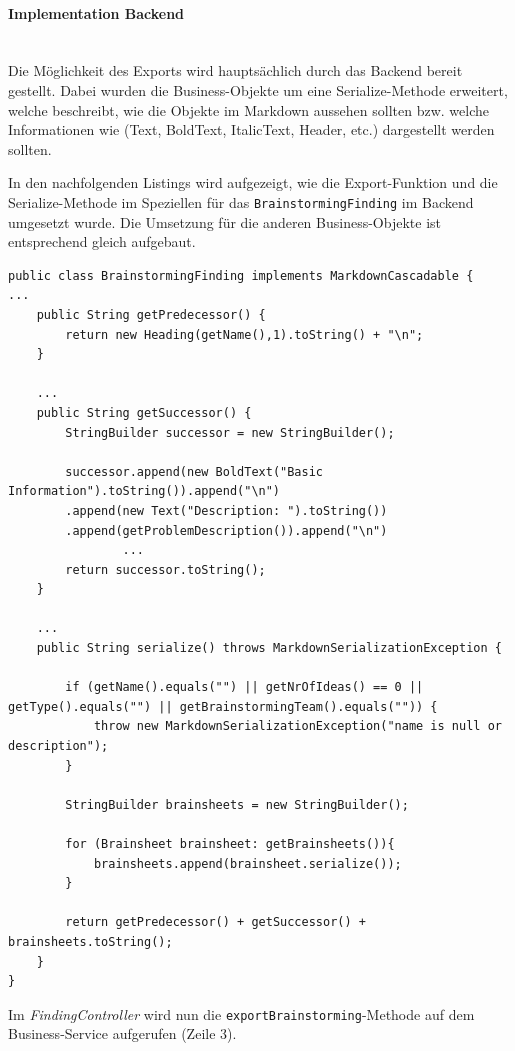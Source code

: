 \paragraph*{Implementation Backend}~\\
Die Möglichkeit des Exports wird hauptsächlich durch das Backend bereit gestellt. Dabei wurden die Business-Objekte um eine Serialize-Methode erweitert, welche beschreibt, wie die Objekte im Markdown aussehen sollten bzw. welche Informationen wie (Text, BoldText, ItalicText, Header, etc.) dargestellt werden sollten. 

In den nachfolgenden Listings wird aufgezeigt, wie die Export-Funktion und die Serialize-Methode im Speziellen für das \texttt{BrainstormingFinding} im Backend umgesetzt wurde. Die Umsetzung für die anderen Business-Objekte ist entsprechend gleich aufgebaut. 

\begin{lstlisting}[caption={Serialize-Methode von BrainstormingFinding}, label=markdownBrainstormingFinding]
public class BrainstormingFinding implements MarkdownCascadable {
...
	public String getPredecessor() {
	    return new Heading(getName(),1).toString() + "\n";
	}
	
	...
	public String getSuccessor() {
	    StringBuilder successor = new StringBuilder();
	
	    successor.append(new BoldText("Basic Information").toString()).append("\n")
	    .append(new Text("Description: ").toString())
	    .append(getProblemDescription()).append("\n")
	            ...
	    return successor.toString();
	}
	
	...
	public String serialize() throws MarkdownSerializationException {
	
	    if (getName().equals("") || getNrOfIdeas() == 0 || getType().equals("") || getBrainstormingTeam().equals("")) {
	        throw new MarkdownSerializationException("name is null or description");
	    }
	
	    StringBuilder brainsheets = new StringBuilder();
	
	    for (Brainsheet brainsheet: getBrainsheets()){
	        brainsheets.append(brainsheet.serialize());
	    }
	    
	    return getPredecessor() + getSuccessor() + brainsheets.toString();
	}
}

\end{lstlisting}

Im \textit{FindingController} wird nun die \texttt{exportBrainstorming}-Methode auf dem Business-Service aufgerufen (Zeile 3).


